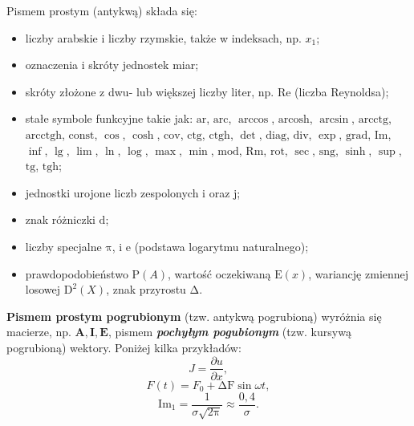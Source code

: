 Pismem prostym (antykwą) składa się:
\begin{itemize}
\item liczby arabskie i liczby rzymskie, także w indeksach, np. $x_1$;
\item oznaczenia i skróty jednostek miar;
\item skróty złożone z dwu- lub większej liczby liter, np. $\mathrm{Re}$ (liczba Reynoldsa);
\item stałe symbole funkcyjne takie jak:
$\mathrm{ar}$, $\mathrm{arc}$, $\arccos$, $\mathrm{arcosh}$, $\arcsin$, $\mathrm{arcctg}$, $\mathrm{arcctgh}$, $\mathrm{const}$, $\cos$, $\cosh$, $\mathrm{cov}$, $\mathrm{ctg}$, $\mathrm{ctgh}$, $\det$, $\mathrm{diag}$, $\mathrm{div}$, $\exp$, $\mathrm{grad}$, $\mathrm{Im}$, $\inf$, $\lg$, $\lim$, $\ln$, $\log$, $\max$, $\min$, $\mathrm{mod}$, $\mathrm{Rm}$, $\mathrm{rot}$, $\sec$, $\mathrm{sng}$, $\sinh$, $\sup$, $\mathrm{tg}$, $\mathrm{tgh}$;
\item jednostki urojone liczb zespolonych i oraz j;
\item znak różniczki $\mathrm{d}$;
\item liczby specjalne $\mathrm{\pi}$, i e (podstawa logarytmu naturalnego);
\item prawdopodobieństwo $\mathrm{P}(A)$, wartość oczekiwaną $\mathrm{E}(x)$, wariancję zmiennej losowej $\mathrm{D}^2(X)$, znak przyrostu $\mathrm{\Delta}$.
\end{itemize}

\textbf{Pismem prostym pogrubionym} (tzw. antykwą pogrubioną) wyróżnia się macierze, np. $\mathrm{\mathbf{A,I,E}}$, pismem \textit{\textbf{pochyłym pogubionym}} (tzw. kursywą pogrubioną) \pauza wektory. Poniżej kilka przykładów:
\begin{equation*}
J = \frac{\partial u}{\partial x},
\end{equation*}
\begin{equation*}
F(t) = F_0 + \mathrm{\Delta F}\sin \omega t,
\end{equation*}
\begin{equation*}
\mathrm{Im}_1 = \frac{1}{\sigma \sqrt{2 \mathrm{\pi}}} \approx \frac{0,4}{\sigma}.
\end{equation*}

